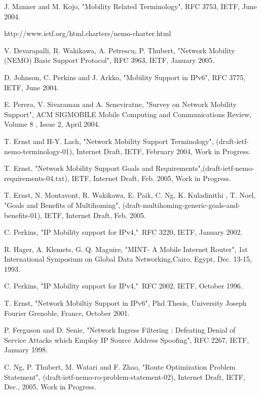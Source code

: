 \begin{thebibliography}{99}

J. Manner and M. Kojo, "Mobility Related
Terminology", RFC 3753, IETF, June 2004.

http://www.ietf.org/html.charters/nemo-charter.html

V. Devarapalli, R. Wakikawa, A. Petrescu, P. Thubert, "Network
Mobility (NEMO) Basic Support Protocol", RFC 3963, IETF, January
2005.

D. Johnson, C. Perkins and J. Arkko, "Mobility Support in IPv6", RFC
3775, IETF, June 2004.

E. Perera, V. Sivaraman and A. Seneviratne, "Survey on Network
Mobility Support", ACM SIGMOBILE Mobile Computing and Communications
Review, Volume 8 , Issue 2, April 2004.

T. Ernst and H-Y. Lach, "Network Mobility Support Terminology",
(draft-ietf-nemo-terminology-01), Internet Draft, IETF, February
2004, Work in Progress.

T. Ernst, "Network Mobility Support Goals and
Requirements",(draft-ietf-nemo-requirements-04.txt), IETF, Internet
Draft, Feb. 2005, Work in Progress.

T. Ernst, N. Montavont, R. Wakikawa, E. Paik, C. Ng, K. Kuladinithi
, T. Noel, "Goals and Benefits of Multihoming",
(draft-multihoming-generic-goals-and-benefits-01), IETF, Internet
Draft, Feb. 2005.

C. Perkins, "IP Mobility support for IPv4,"\ RFC 3220, IETF, January
2002.

R. Hager, A. Klemets, G. Q. Maguire, "MINT- A Mobile Internet
Router", 1st International Symposium on Global Data
Networking,Cairo, Egypt, Dec. 13-15, 1993.

C. Perkins, "IP Mobility support for IPv4,"\ RFC 2002, IETF, October
1996.

T. Ernst, "Network Mobiltiy Support in IPv6", Phd Thesis, University
Joseph Fourier Grenoble, France, October 2001.

P. Ferguson and D. Senie, "Network Ingress Filtering : Defeating
Denial of Service Attacks which Employ IP Source Address Spoofing",
RFC 2267, IETF, January 1998.

C. Ng, P. Thubert, M. Watari and F. Zhao, "Route Optimization
Problem Statement", (draft-ietf-nemo-ro-problem-statement-02),
Internet Draft, IETF, Dec., 2005, Work in Progress.


\end{thebibliography}
